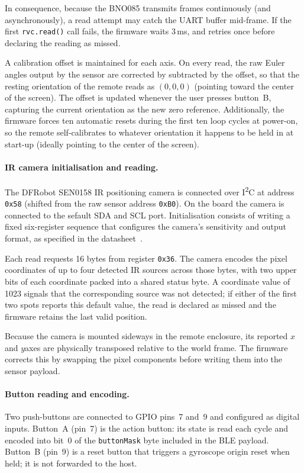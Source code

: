 \documentclass[12pt, a4paper]{article}
\begin{document}
In consequence, because the BNO085 transmits frames continuously (and asynchronously), a read attempt may catch the UART buffer mid-frame. If the first \texttt{rvc.read()} call fails, the firmware waits 3\,ms, and retries once before declaring the reading as missed.

A calibration offset is maintained for each axis. On every read, the raw Euler angles output by the sensor are corrected by subtracted by the offset, so that the resting orientation of the remote reads as $(0, 0, 0)$ (pointing toward the center of the screen). The offset is updated whenever the user presses button~B, capturing the current orientation as the new zero reference. Additionally, the firmware forces ten automatic resets during the first ten loop cycles at power-on, so the remote self-calibrates to whatever orientation it happens to be held in at start-up (ideally pointing to the center of the screen).

\paragraph{IR camera initialisation and reading.}
The DFRobot SEN0158 IR positioning camera is connected over I\textsuperscript{2}C at address \texttt{0x58} (shifted from the raw sensor address \texttt{0xB0}). On the board the camera is connected to the sefault SDA and SCL port. Initialisation consists of writing a fixed six-register sequence that configures the camera's sensitivity and output format, as specified in the datasheet~\cite{ir_camera}.

Each read requests 16 bytes from register \texttt{0x36}. The camera encodes the pixel coordinates of up to four detected IR sources across those bytes, with two upper bits of each coordinate packed into a shared status byte. A coordinate value of 1023 signals that the corresponding source was not detected; if either of the first two spots reports this default value, the read is declared as missed and the firmware retains the last valid position.

Because the camera is mounted sideways in the remote enclosure, its reported $x$ and $y$axes are physically transposed relative to the world frame. The firmware corrects this by swapping the pixel components before writing them into the sensor payload.

\paragraph{Button reading and encoding.}
Two push-buttons are connected to GPIO pins~7 and~9 and configured as digital inputs. Button~A (pin~7) is the action button: its state is read each cycle and encoded into bit~0 of the \texttt{buttonMask} byte included in the BLE payload. Button~B (pin~9) is a reset button that triggers a gyroscope origin reset when held; it is not forwarded to the host.
\end{document}
